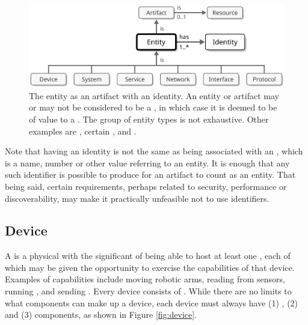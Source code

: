 \vfill

\begin{figure}[ht!]
  \centering
  \includegraphics[scale=0.9]{figures/entity}
  \caption{
    The entity as an artifact with an identity.
    An entity or artifact may or may not be considered to be a , in which case it is deemed to be of value to a .
    The group of entity types is not exhaustive.
    Other examples are , certain ,  and .
  }
  \label{fig:entity}
\end{figure}


Note that having an identity is not the same as being associated with an , which is a name, number or other value referring to an entity.
It is enough that any such identifier is possible to produce for an artifact to count as an entity.
That being said, certain  requirements, perhaps related to security, performance or discoverability, may make it practically unfeasible not to use identifiers.

\subsection{Device}
\label{sec:concepts:device}

A  is a physical  with the significant  of being able to host at least one , each of which may be given the opportunity to exercise the capabilities of that device.
Examples of capabilities include moving robotic arms, reading from sensors, running , and sending . 
Every device consists of .
While there are no limits to what components can make up a device, each device must always have (1) , (2)  and (3)  components, as shown in Figure \ref{fig:device}.

